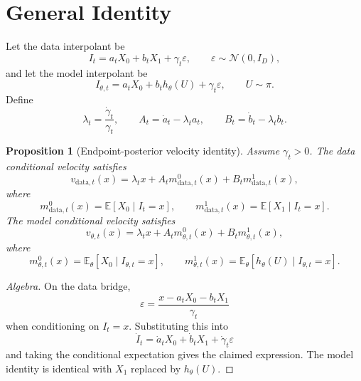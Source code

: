 \documentclass[11pt]{article}
\newcommand{\E}{\mathbb{E}}
\newcommand{\cN}{\mathcal{N}}
\newcommand{\data}{\mathrm{data}}
\theoremstyle{plain}
\newtheorem{proposition}{Proposition}
\theoremstyle{definition}
\begin{document}
\section{General Identity}

Let the data interpolant be
\begin{equation}
I_t
=
a_tX_0+b_tX_1+\gamma_t\varepsilon,
\qquad
\varepsilon\sim\cN(0,I_D),
\end{equation}
and let the model interpolant be
\begin{equation}
I_{\theta,t}
=
a_tX_0+b_t h_\theta(U)+\gamma_t\varepsilon,
\qquad
U\sim\pi.
\end{equation}
Define
\begin{equation}
\lambda_t=\frac{\dot\gamma_t}{\gamma_t},
\qquad
A_t=\dot a_t-\lambda_t a_t,
\qquad
B_t=\dot b_t-\lambda_t b_t.
\end{equation}

\begin{proposition}[Endpoint-posterior velocity identity]
Assume \(\gamma_t>0\). The data conditional velocity satisfies
\begin{equation}
v_{\data,t}(x)
=
\lambda_t x
+A_t m_{\data,t}^0(x)
+B_t m_{\data,t}^1(x),
\end{equation}
where
\begin{equation}
m_{\data,t}^0(x)
=
\E[X_0\mid I_t=x],
\qquad
m_{\data,t}^1(x)
=
\E[X_1\mid I_t=x].
\end{equation}
The model conditional velocity satisfies
\begin{equation}
v_{\theta,t}(x)
=
\lambda_t x
+A_t m_{\theta,t}^0(x)
+B_t m_{\theta,t}^1(x),
\end{equation}
where
\begin{equation}
m_{\theta,t}^0(x)
=
\E_\theta[X_0\mid I_{\theta,t}=x],
\qquad
m_{\theta,t}^1(x)
=
\E_\theta[h_\theta(U)\mid I_{\theta,t}=x].
\end{equation}
\end{proposition}

\begin{proof}[Algebra]
On the data bridge,
\begin{equation}
\varepsilon
=
\frac{x-a_tX_0-b_tX_1}{\gamma_t}
\end{equation}
when conditioning on \(I_t=x\). Substituting this into
\begin{equation}
\dot I_t=\dot a_tX_0+\dot b_tX_1+\dot\gamma_t\varepsilon
\end{equation}
and taking the conditional expectation gives the claimed expression. The model
identity is identical with \(X_1\) replaced by \(h_\theta(U)\).
\end{proof}
\end{document}
